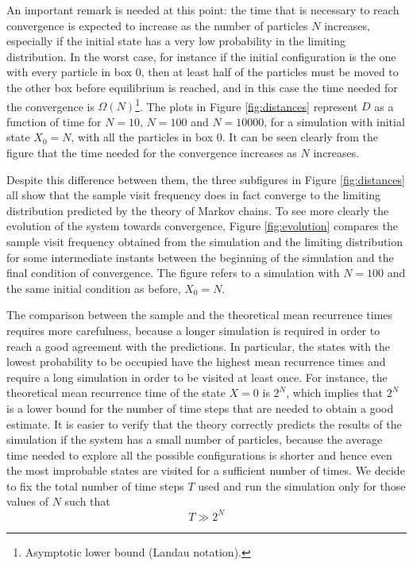 An important remark is needed at this point: the time that is necessary to reach convergence is expected to increase as the number of particles $N$ increases, especially if the initial state has a very low probability in the limiting distribution. In the worst case, for instance if the initial configuration is the one with every particle in box 0, then at least half of the particles must be moved to the other box before equilibrium is reached, and in this case the time needed for the convergence is $\Omega(N)$\footnote{Asymptotic lower bound (Landau notation).}. The plots in Figure \ref{fig:distances} represent $D$ as a function of time for $N = 10$, $N = 100$ and $N = 10000$, for a simulation with initial state $X_0 = N$, \ie with all the particles in box 0. It can be seen clearly from the figure that the time needed for the convergence increases as $N$ increases.

Despite this difference between them, the three subfigures in Figure \ref{fig:distances} all show that the sample visit frequency does in fact converge to the limiting distribution predicted by the theory of Markov chains. To see more clearly the evolution of the system towards convergence, Figure \ref{fig:evolution} compares the sample visit frequency obtained from the simulation and the limiting distribution for some intermediate instants between the beginning of the simulation and the final condition of convergence. The figure refers to a simulation with $N = 100$ and the same initial condition as before, \ie $X_0 = N$. 

\medskip
The comparison between the sample and the theoretical mean recurrence times requires more carefulness, because a longer simulation is required in order to reach a good agreement with the predictions. In particular, the states with the lowest probability to be occupied have the highest mean recurrence times and require a long simulation in order to be visited at least once. For instance, the theoretical mean recurrence time of the state $X= 0$ is $2^N$, which implies that $2^N$ is a lower bound for the number of time steps that are needed to obtain a good estimate. It is easier to verify that the theory correctly predicts the results of the simulation if the system has a small number of particles, because the average time needed to explore all the possible configurations is shorter and hence even the most improbable states are visited for a sufficient number of times. We decide to fix the total number of time steps $T$ used and run the simulation only for those values of $N$ such that
\begin{equation}\label{eq:time}
  T \gg 2^N
\end{equation}

